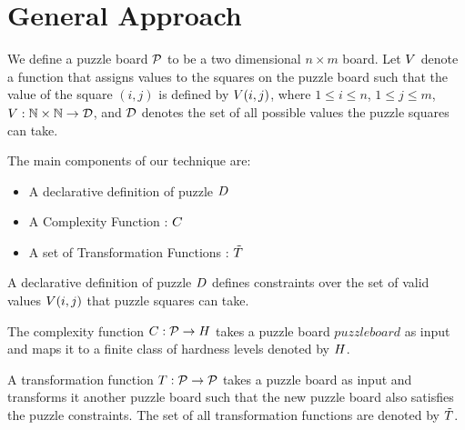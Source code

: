 \documentclass[12pt]{article}
\begin{document}
\maketitle



\section{General Approach}

\begin{definition}
We define a puzzle board $\mathcal{P}$ to be a two dimensional $n
\times m$ board. Let $V$ denote a function that assigns
values to the squares on the puzzle board such that the value of the
square $(i,j)$ is defined by $V(i,j)$, where $1 \leq i \leq
n$, $1 \leq j \leq m$, $V: \mathbb{N} \times \mathbb{N} \rightarrow
\mathcal{D}$, and $\mathcal{D}$ denotes the set of all possible
values the puzzle squares can take.
\end{definition}

The main components of our technique are:
\begin{itemize}
\item{A declarative definition of puzzle $D$}
\item{A Complexity Function : $C$}
\item{A set of Transformation Functions : $\tilde{T}$}
\end{itemize}

\begin{definition}
A declarative definition of puzzle $D$ defines constraints over the set of valid values $V(i,j)$ that puzzle squares can take.
\end{definition}

\begin{definition}
The complexity function $C : \mathcal{P} \rightarrow
H$ takes a puzzle board $puzzleboard$ as input and maps
it to a finite class of hardness levels denoted by $H$.
\end{definition}

\begin{definition}
A transformation function $T : \mathcal{P} \rightarrow \mathcal{P}$ takes a puzzle board as input and transforms it another puzzle board such that the new puzzle board also satisfies the puzzle constraints. The set of all transformation functions are denoted by $\tilde{T}$.
\end{definition}
\end{document}
